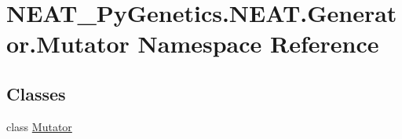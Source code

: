 \hypertarget{namespaceNEAT__PyGenetics_1_1NEAT_1_1Generator_1_1Mutator}{}\section{N\+E\+A\+T\+\_\+\+Py\+Genetics.\+N\+E\+A\+T.\+Generator.\+Mutator Namespace Reference}
\label{namespaceNEAT__PyGenetics_1_1NEAT_1_1Generator_1_1Mutator}
\subsection*{Classes}
\begin{DoxyCompactItemize}
\item 
class \hyperlink{classNEAT__PyGenetics_1_1NEAT_1_1Generator_1_1Mutator_1_1Mutator}{Mutator}
\end{DoxyCompactItemize}
